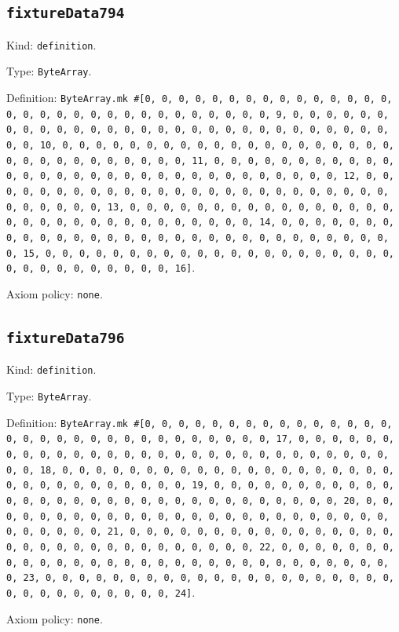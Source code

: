 \documentclass[11pt]{article}
\begin{document}
\subsection*{\texttt{fixtureData794}}
\noindent Kind: \texttt{definition}.\par
\noindent Type: \texttt{ByteArray}.\par
\noindent Definition: \texttt{ByteArray.mk \#[0, 0, 0, 0, 0, 0, 0, 0, 0, 0, 0, 0, 0, 0, 0, 0, 0, 0, 0, 0, 0, 0, 0, 0, 0, 0, 0, 0, 0, 0, 0, 9, 0, 0, 0, 0, 0, 0, 0, 0, 0, 0, 0, 0, 0, 0, 0, 0, 0, 0, 0, 0, 0, 0, 0, 0, 0, 0, 0, 0, 0, 0, 0, 10, 0, 0, 0, 0, 0, 0, 0, 0, 0, 0, 0, 0, 0, 0, 0, 0, 0, 0, 0, 0, 0, 0, 0, 0, 0, 0, 0, 0, 0, 0, 0, 11, 0, 0, 0, 0, 0, 0, 0, 0, 0, 0, 0, 0, 0, 0, 0, 0, 0, 0, 0, 0, 0, 0, 0, 0, 0, 0, 0, 0, 0, 0, 0, 12, 0, 0, 0, 0, 0, 0, 0, 0, 0, 0, 0, 0, 0, 0, 0, 0, 0, 0, 0, 0, 0, 0, 0, 0, 0, 0, 0, 0, 0, 0, 0, 13, 0, 0, 0, 0, 0, 0, 0, 0, 0, 0, 0, 0, 0, 0, 0, 0, 0, 0, 0, 0, 0, 0, 0, 0, 0, 0, 0, 0, 0, 0, 0, 14, 0, 0, 0, 0, 0, 0, 0, 0, 0, 0, 0, 0, 0, 0, 0, 0, 0, 0, 0, 0, 0, 0, 0, 0, 0, 0, 0, 0, 0, 0, 0, 15, 0, 0, 0, 0, 0, 0, 0, 0, 0, 0, 0, 0, 0, 0, 0, 0, 0, 0, 0, 0, 0, 0, 0, 0, 0, 0, 0, 0, 0, 0, 0, 16]}.\par
\noindent Axiom policy: \texttt{none}.\par
\subsection*{\texttt{fixtureData796}}
\noindent Kind: \texttt{definition}.\par
\noindent Type: \texttt{ByteArray}.\par
\noindent Definition: \texttt{ByteArray.mk \#[0, 0, 0, 0, 0, 0, 0, 0, 0, 0, 0, 0, 0, 0, 0, 0, 0, 0, 0, 0, 0, 0, 0, 0, 0, 0, 0, 0, 0, 0, 0, 17, 0, 0, 0, 0, 0, 0, 0, 0, 0, 0, 0, 0, 0, 0, 0, 0, 0, 0, 0, 0, 0, 0, 0, 0, 0, 0, 0, 0, 0, 0, 0, 18, 0, 0, 0, 0, 0, 0, 0, 0, 0, 0, 0, 0, 0, 0, 0, 0, 0, 0, 0, 0, 0, 0, 0, 0, 0, 0, 0, 0, 0, 0, 0, 19, 0, 0, 0, 0, 0, 0, 0, 0, 0, 0, 0, 0, 0, 0, 0, 0, 0, 0, 0, 0, 0, 0, 0, 0, 0, 0, 0, 0, 0, 0, 0, 20, 0, 0, 0, 0, 0, 0, 0, 0, 0, 0, 0, 0, 0, 0, 0, 0, 0, 0, 0, 0, 0, 0, 0, 0, 0, 0, 0, 0, 0, 0, 0, 21, 0, 0, 0, 0, 0, 0, 0, 0, 0, 0, 0, 0, 0, 0, 0, 0, 0, 0, 0, 0, 0, 0, 0, 0, 0, 0, 0, 0, 0, 0, 0, 22, 0, 0, 0, 0, 0, 0, 0, 0, 0, 0, 0, 0, 0, 0, 0, 0, 0, 0, 0, 0, 0, 0, 0, 0, 0, 0, 0, 0, 0, 0, 0, 23, 0, 0, 0, 0, 0, 0, 0, 0, 0, 0, 0, 0, 0, 0, 0, 0, 0, 0, 0, 0, 0, 0, 0, 0, 0, 0, 0, 0, 0, 0, 0, 24]}.\par
\noindent Axiom policy: \texttt{none}.\par
\end{document}
